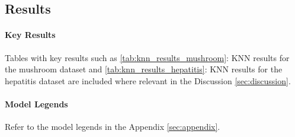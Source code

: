 \subsection{Results}
\label{subsec:results}

\paragraph{Key Results} Tables with key results such as \autoref{tab:knn_results_mushroom}: KNN results for the mushroom dataset and \autoref{tab:knn_results_hepatitis}: KNN results for the hepatitis dataset are included where relevant in the Discussion \autoref{sec:discussion}.

\paragraph{Model Legends} Refer to the model legends in the Appendix \autoref{sec:appendix}.
